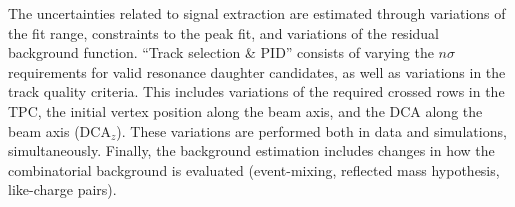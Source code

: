 The uncertainties related to signal extraction are estimated through variations of the fit range, constraints to the peak fit, and variations of the residual background function. ``Track selection \& PID'' consists of varying the $n\sigma$ requirements for valid resonance daughter candidates, as well as variations in the track quality criteria. This includes variations of the required crossed rows in the TPC, the initial vertex position along the beam axis, and the DCA along the beam axis (DCA$_z$). These variations are performed both in data and simulations, simultaneously.  Finally, the background estimation includes changes in how the combinatorial background is evaluated (event-mixing, reflected mass hypothesis, like-charge pairs). 


\begin{table}
\centering
\caption{The most relevant systematic uncertainties for the resonance analysis as a function of \SOPT. ``HM'' in this table represents the \SOPT-integrated spectra. The uncertainties are reported as percentage values. Uncertainties are \pt-dependent, and ranges listed represent the minimum and maximum values presented in the final spectra (see text for details). }\label{Tab:SysRes}


\end{table}

